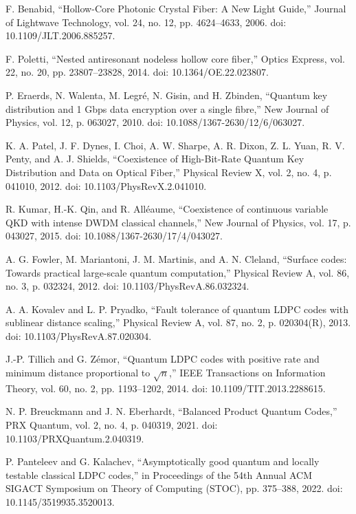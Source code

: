 \documentclass{article}
\begin{document}
\begin{thebibliography}{99}

F. Benabid, ``Hollow-Core Photonic Crystal Fiber: A New Light Guide,'' Journal of Lightwave Technology, vol. 24, no. 12, pp. 4624--4633, 2006. doi: 10.1109/JLT.2006.885257.

F. Poletti, ``Nested antiresonant nodeless hollow core fiber,'' Optics Express, vol. 22, no. 20, pp. 23807--23828, 2014. doi: 10.1364/OE.22.023807.

P. Eraerds, N. Walenta, M. Legré, N. Gisin, and H. Zbinden, ``Quantum key distribution and 1 Gbps data encryption over a single fibre,'' New Journal of Physics, vol. 12, p. 063027, 2010. doi: 10.1088/1367-2630/12/6/063027.

K. A. Patel, J. F. Dynes, I. Choi, A. W. Sharpe, A. R. Dixon, Z. L. Yuan, R. V. Penty, and A. J. Shields, ``Coexistence of High-Bit-Rate Quantum Key Distribution and Data on Optical Fiber,'' Physical Review X, vol. 2, no. 4, p. 041010, 2012. doi: 10.1103/PhysRevX.2.041010.

R. Kumar, H.-K. Qin, and R. Alléaume, ``Coexistence of continuous variable QKD with intense DWDM classical channels,'' New Journal of Physics, vol. 17, p. 043027, 2015. doi: 10.1088/1367-2630/17/4/043027.

A. G. Fowler, M. Mariantoni, J. M. Martinis, and A. N. Cleland, ``Surface codes: Towards practical large-scale quantum computation,'' Physical Review A, vol. 86, no. 3, p. 032324, 2012. doi: 10.1103/PhysRevA.86.032324.

A. A. Kovalev and L. P. Pryadko, ``Fault tolerance of quantum LDPC codes with sublinear distance scaling,'' Physical Review A, vol. 87, no. 2, p. 020304(R), 2013. doi: 10.1103/PhysRevA.87.020304.

J.-P. Tillich and G. Zémor, ``Quantum LDPC codes with positive rate and minimum distance proportional to $\sqrt{n}$,'' IEEE Transactions on Information Theory, vol. 60, no. 2, pp. 1193--1202, 2014. doi: 10.1109/TIT.2013.2288615.

N. P. Breuckmann and J. N. Eberhardt, ``Balanced Product Quantum Codes,'' PRX Quantum, vol. 2, no. 4, p. 040319, 2021. doi: 10.1103/PRXQuantum.2.040319.

P. Panteleev and G. Kalachev, ``Asymptotically good quantum and locally testable classical LDPC codes,'' in Proceedings of the 54th Annual ACM SIGACT Symposium on Theory of Computing (STOC), pp. 375--388, 2022. doi: 10.1145/3519935.3520013.


\end{thebibliography}
\end{document}

